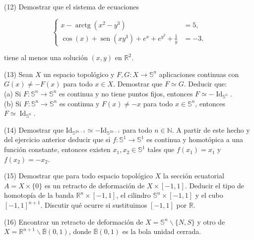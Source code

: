 \documentclass[
  a4paper,
  spanish,
  12pt,
]{scrartcl}
\begin{document}
\begin{ejer}
(12) Demostrar que el sistema de ecuaciones

$$
\left\{\begin{aligned}
x-\operatorname{arctg}\left(x^{2}-y^{3}\right) & =5, \\
\cos (x)+\operatorname{sen}\left(x y^{3}\right)+e^{x}+e^{y^{2}}+\frac{1}{y} & =-3 .
\end{aligned}\right.
$$

tiene al menos una solución $(x, y)$ en $\mathbb{R}^{2}$.\\
\end{ejer}

\begin{ejer}
(13) Sean $X$ un espacio topológico y $F, G: X \rightarrow \mathbb{S}^{n}$ aplicaciones continuas con $G(x) \neq-F(x)$ para todo $x \in X$. Demostrar que $F \simeq G$. Deducir que:\\
(a) Si $F: \mathbb{S}^{n} \rightarrow \mathbb{S}^{n}$ es continua y no tiene puntos fijos, entonces $F \simeq-\operatorname{Id}_{\mathbb{S}^{n}}$.\\
(b) Si $F: \mathbb{S}^{n} \rightarrow \mathbb{S}^{n}$ es continua y $F(x) \neq-x$ para todo $x \in \mathbb{S}^{n}$, entonces $F \simeq \operatorname{Id}_{\mathbb{S}^{n}}$.\\
\end{ejer}

\begin{ejer}
(14) Demostrar que $\mathrm{Id}_{\mathbb{S}^{2 n-1}} \simeq-\mathrm{Id}_{\mathbb{S}^{2 n-1}}$ para todo $n \in \mathbb{N}$. A partir de este hecho y del ejercicio anterior deducir que si $f: \mathbb{S}^{1} \rightarrow \mathbb{S}^{1}$ es continua y homotópica a una función constante, entonces existen $x_{1}, x_{2} \in \mathbb{S}^{1}$ tales que $f\left(x_{1}\right)=x_{1}$ y $f\left(x_{2}\right)=-x_{2}$.\\
\end{ejer}

\begin{ejer}
(15) Demostrar que para todo espacio topológico $X$ la sección ecuatorial $A=X \times\{0\}$ es un retracto de deformación de $X \times[-1,1]$. Deducir el tipo de homotopía de la banda $\mathbb{R}^{n} \times[-1,1]$, el cilindro $\mathbb{S}^{n} \times[-1,1]$ y el cubo $[-1,1]^{n+1}$. Discutir qué ocurre si sustituimos $[-1,1]$ por $\mathbb{R}$.\\
\end{ejer}

\begin{ejer}
(16) Encontrar un retracto de deformación de $X=\mathbb{S}^{n} \backslash\{N, S\}$ y otro de $X=\mathbb{R}^{n+1} \backslash \overline{\mathbb{B}}(0,1)$, donde $\overline{\mathbb{B}}(0,1)$ es la bola unidad cerrada.\\
\end{ejer}
\end{document}
